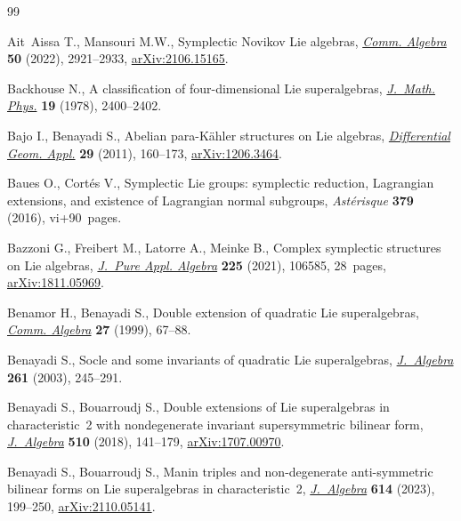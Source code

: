 \begin{thebibliography}{99}
\footnotesize\itemsep=0pt

Ait~Aissa T., Mansouri M.W., Symplectic {N}ovikov {L}ie algebras, \href{https://doi.org/10.1080/00927872.2021.2022157}{\textit{Comm.
 Algebra}} \textbf{50} (2022), 2921--2933, \href{https://arxiv.org/abs/2106.15165}{arXiv:2106.15165}.

Backhouse N., A classification of four-dimensional {L}ie superalgebras,
 \href{https://doi.org/10.1063/1.523598}{\textit{J.~Math. Phys.}} \textbf{19} (1978), 2400--2402.

Bajo I., Benayadi S., Abelian para-{K}\"ahler structures on {L}ie algebras,
 \href{https://doi.org/10.1016/j.difgeo.2011.02.003}{\textit{Differential Geom. Appl.}} \textbf{29} (2011), 160--173,
 \href{https://arxiv.org/abs/1206.3464}{arXiv:1206.3464}.

Baues O., Cort\'es V., Symplectic {L}ie groups: symplectic reduction,
 {L}agrangian extensions, and existence of {L}agrangian normal subgroups,
 \textit{Ast\'erisque} \textbf{379} (2016), vi+90~pages.

Bazzoni G., Freibert M., Latorre A., Meinke B., Complex symplectic structures
 on {L}ie algebras, \href{https://doi.org/10.1016/j.jpaa.2020.106585}{\textit{J.~Pure Appl. Algebra}} \textbf{225} (2021),
 106585, 28~pages, \href{https://arxiv.org/abs/1811.05969}{arXiv:1811.05969}.

Benamor H., Benayadi S., Double extension of quadratic {L}ie superalgebras,
 \href{https://doi.org/10.1080/00927879908826421}{\textit{Comm. Algebra}} \textbf{27} (1999), 67--88.

Benayadi S., Socle and some invariants of quadratic {L}ie superalgebras,
 \href{https://doi.org/10.1016/S0021-8693(02)00682-8}{\textit{J.~Algebra}} \textbf{261} (2003), 245--291.

Benayadi S., Bouarroudj S., Double extensions of {L}ie superalgebras in
 characteristic~2 with nondegenerate invariant supersymmetric bilinear form,
 \href{https://doi.org/10.1016/j.jalgebra.2018.06.005}{\textit{J.~Algebra}} \textbf{510} (2018), 141--179, \href{https://arxiv.org/abs/1707.00970}{arXiv:1707.00970}.

Benayadi S., Bouarroudj S., Manin triples and non-degenerate anti-symmetric
 bilinear forms on {L}ie superalgebras in characteristic~2,
 \href{https://doi.org/10.1016/j.jalgebra.2022.09.019}{\textit{J.~Algebra}} \textbf{614} (2023), 199--250, \href{https://arxiv.org/abs/2110.05141}{arXiv:2110.05141}.


\end{thebibliography}
